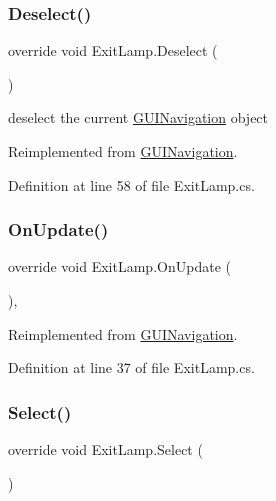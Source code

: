 \subsubsection{\texorpdfstring{Deselect()}{Deselect()}}
{\footnotesize\ttfamily override void Exit\+Lamp.\+Deselect (\begin{DoxyParamCaption}{ }\end{DoxyParamCaption})\hspace{0.3cm}{\ttfamily [virtual]}}



deselect the current \mbox{\hyperlink{class_g_u_i_navigation}{G\+U\+I\+Navigation}} object 



Reimplemented from \mbox{\hyperlink{class_g_u_i_navigation_a98563f06446b45814ff78978b472e948}{G\+U\+I\+Navigation}}.



Definition at line 58 of file Exit\+Lamp.\+cs.

\mbox{\label{class_exit_lamp_a74a35c513b3bea3104cde1c9b7687b52}} 
\subsubsection{\texorpdfstring{On\+Update()}{OnUpdate()}}
{\footnotesize\ttfamily override void Exit\+Lamp.\+On\+Update (\begin{DoxyParamCaption}{ }\end{DoxyParamCaption})\hspace{0.3cm}{\ttfamily [protected]}, {\ttfamily [virtual]}}



Reimplemented from \mbox{\hyperlink{class_g_u_i_navigation_aad668226e400889bceea3914750b949e}{G\+U\+I\+Navigation}}.



Definition at line 37 of file Exit\+Lamp.\+cs.

\mbox{\label{class_exit_lamp_af51dbc04e07910eaf73808834630fdd4}} 
\subsubsection{\texorpdfstring{Select()}{Select()}}
{\footnotesize\ttfamily override void Exit\+Lamp.\+Select (\begin{DoxyParamCaption}{ }\end{DoxyParamCaption})\hspace{0.3cm}{\ttfamily [virtual]}}



